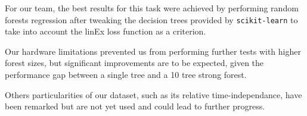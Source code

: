 \documentclass[a4paper,10pt]{article}
\begin{document}
  For our team, the best results for this task were achieved by performing random forests regression after tweaking the decision trees provided by {\tt scikit-learn} to take into account the linEx loss function as a criterion.

  Our hardware limitations prevented us from performing further tests with higher forest sizes, but significant improvements are to be expected, given the  performance gap between a single tree and a 10 tree strong forest.

  Others particularities of our dataset, such as its relative time-independance, have been remarked but are not yet used and could lead to further progress.

%
%
%
%
%
%
%
%
%
%
%
%
%
%
%
%
\end{document}
